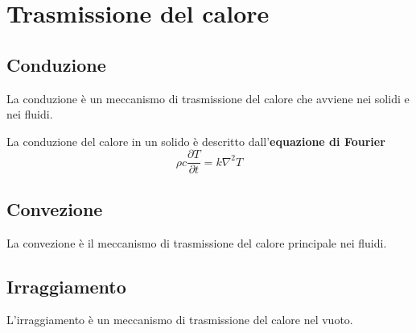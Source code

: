 \chapter{Trasmissione del calore}\label{ch:heat-transmission}
\section{Conduzione}
La conduzione è un meccanismo di trasmissione del calore che avviene nei solidi e nei fluidi.

\noindent
La conduzione del calore in un solido è descritto dall'\textbf{equazione di Fourier}
\begin{equation}
    \rho c \dfrac{\partial T}{\partial t} = k \nabla^2 T
\end{equation}
\section{Convezione}
La convezione è il meccanismo di trasmissione del calore principale nei fluidi.
\section{Irraggiamento}
L'irraggiamento è un meccanismo di trasmissione del calore nel vuoto.

